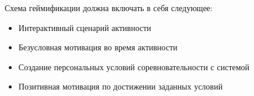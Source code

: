 Схема геймификации должна включать в себя следующее:
\begin{itemize}
	\item Интерактивный сценарий активности
	\item Безусловная мотивация во время активности
	\item Создание персональных условий соревновательности с системой
	\item Позитивная мотивация по достижении заданных условий
\end{itemize}

\begin{comment}
	TODO!!!!!!
Реализация интерактивного сценария активности включает в себя:
\begin{itemize}
	\item ...
\end{itemize}
\end{comment}